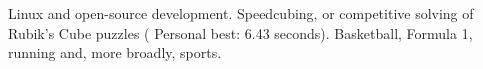 \documentclass[10pt,a4paper]{article} %
\begin{document}
\spacedhrule{1.6em}{-0.4em} %


{Linux and open-source development. Speedcubing, or competitive solving of Rubik's Cube puzzles (
    Personal best: 6.43 seconds). Basketball, Formula 1, running and, more broadly, sports.}

\end{document}
